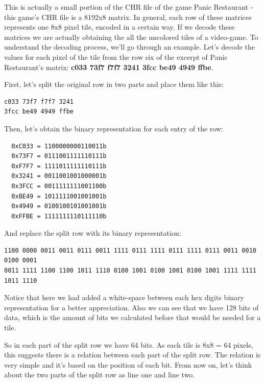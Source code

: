 \documentclass{article}
\begin{document}
\vskip 0.2in

This is actually a small portion of the CHR file of the game Panic Restaurant - this game's CHR file is a 8192x8 matrix. In general, each row of these matrices represents one 8x8 pixel tile, encoded in a certain way. If we decode these matrices we are actually obtaining the all the uncolored tiles of a video-game. To understand the decoding process, we'll go through an example. Let's decode the values for each pixel of the tile from the row six of the excerpt of Panic Restaurant's matrix: \textbf{c033 73f7 f7f7 3241 3fcc be49 4949 ffbe}.
\vskip 0.2in

First, let's split the original row in two parts and place them like this:

\begin{lstlisting}
c033 73f7 f7f7 3241
3fcc be49 4949 ffbe
\end{lstlisting}
\vskip 0.2in

Then, let's obtain the binary representation for each entry of the row:

\vskip 0.2in
\begin{lstlisting}
  0xC033 = 1100000000110011b
  0x73F7 = 0111001111110111b
  0xF7F7 = 1111011111110111b
  0x3241 = 0011001001000001b
  0x3FCC = 0011111111001100b
  0xBE49 = 1011111001001001b
  0x4949 = 0100100101001001b
  0xFFBE = 1111111110111110b
\end{lstlisting}
\vskip 0.2in

And replace the split row with its binary representation:

\begin{lstlisting}
1100 0000 0011 0011 0111 0011 1111 0111 1111 0111 1111 0111 0011 0010 0100 0001
0011 1111 1100 1100 1011 1110 0100 1001 0100 1001 0100 1001 1111 1111 1011 1110
\end{lstlisting}
\vskip 0.2in

Notice that here we had added a white-space between each hex digits binary representation for a better appreciation. Also we can see that we have 128 bits of data, which is the amount of bits we calculated before that would be needed for a tile.

\vskip 0.2in

So in each part of the split row we have 64 bits. As each tile is 8x8 = 64 pixels, this suggests there is a relation between each part of the split row. The relation is very simple and it's based on the position of each bit. From now on, let's think about the two parts of the split row as line one and line two.
\vskip 0.2in
\end{document}
